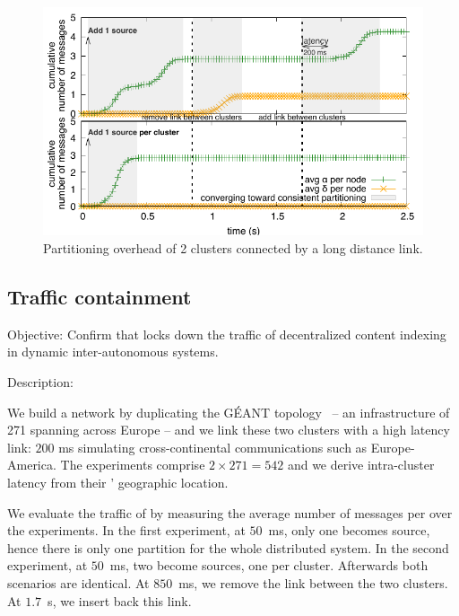 \begin{asparadesc}

\begin{figure}[t]
  \centering\includegraphics[width=\FIGSCALE\columnwidth]{img/as_cast_geant.pdf}
  \caption{\label{fig:geant}Partitioning overhead of 2
    clusters connected by a long distance link.}
\end{figure}


\subsection{Traffic containment}
\item [Objective:] Confirm that \NAME locks down the traffic of
  decentralized content indexing in dynamic
  inter-autonomous systems.
  
\item [Description:]

We build a network by duplicating the G{\'E}ANT
topology~\cite{knight2011internet} -- an infrastructure of 271 \nodes
spanning across Europe -- and we link these two clusters with a high
latency link: $200$ ms simulating cross-continental communications
such as Europe-America. The experiments comprise $2 \times 271 = 542$
\processes and we derive intra-cluster latency from their \processes'
geographic location.

\noindent We evaluate the traffic of \NAME by measuring the average
number of messages per \process over the experiments. In the first
experiment, at $50$~ms, only one \process becomes source, hence there
is only one partition for the whole distributed system. In the second
experiment, at $50$~ms, two \processes become sources, one per
cluster. Afterwards both scenarios are identical. At $850$~ms, we
remove the link between the two clusters. At $1.7$~s, we insert back
this link.


\end{asparadesc}

